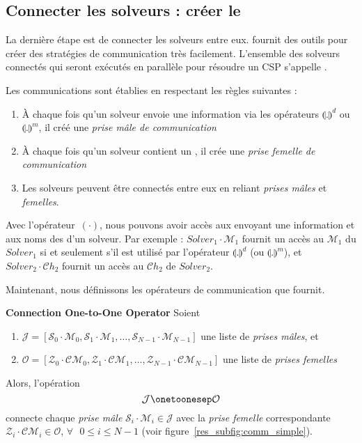 \subsection{Connecter les solveurs : créer le \soset}

La dernière étape est de connecter les solveurs entre eux. \posl{} fournit des outils pour créer des stratégies de communication très facilement. L'ensemble des solveurs connectés qui seront exécutés en parallèle pour résoudre un CSP s'appelle \INTROsoset{}.

Les communications sont établies en respectant les règles suivantes :
\begin{enumerate}
\item  À chaque  fois qu'un  solveur  envoie une information via les opérateurs  $\llparenthesis .\rrparenthesis^{d}$  ou $\llparenthesis   .\rrparenthesis^{m}$, il créé une {\it prise mâle de communication} 
\item À chaque fois qu'un  solveur contient un \opch{}, il  crée une {\it prise femelle de communication} 
\item Les solveurs peuvent être connectés entre eux en reliant {\it prises mâles} et {\it femelles}.
\end{enumerate}

Avec l'opérateur~$(\cdot)$, nous  pouvons avoir accès aux  \oms{} envoyant une information et aux noms des \opchs{} d'un solveur. Par exemple : $Solver_1\cdot\mathcal{M}_1$ fournit un accès au \om{} $\mathcal{M}_1$ du $Solver_1$ si et seulement s'il est utilisé par l'opérateur  $\llparenthesis .\rrparenthesis^{d}$  (ou $\llparenthesis.\rrparenthesis^{m}$), et $Solver_2\cdot\mathcal{C}h_2$ fournit un accès au \opch{} $\mathcal{C}h_2$ de $Solver_2$.

Maintenant, nous définissons les opérateurs de communication que \posl{} fournit.

\begin{lemma}\label{res_op_conn:1to1}
{\bf Connection One-to-One Operator} Soient
\begin{enumerate}
\item $\mathcal{J} = \left[\mathcal{S}_0\cdot \mathcal{M}_0, \mathcal{S}_1\cdot \mathcal{M}_1,\dots, \mathcal{S}_{N-1}\cdot \mathcal{M}_{N-1}\right]$ une liste de  {\it prises mâles}, et
\item $\mathcal{O} = \left[\mathcal{Z}_0\cdot \mathcal{CM}_0, \mathcal{Z}_1\cdot \mathcal{CM}_1,\dots, \mathcal{Z}_{N-1}\cdot \mathcal{CM}_{N-1}\right]$ une liste de {\it prises femelles}
\end{enumerate} Alors, l'opération
\[
\mathcal{J} \onetoonesep \mathcal{O}
\]
connecte chaque {\it prise mâle} $\mathcal{S}_i\cdot \mathcal{M}_i \in \mathcal{J}$ avec la {\it prise femelle} correspondante $\mathcal{Z}_i\cdot \mathcal{CM}_i \in \mathcal{O}$, $\forall\textbf{ }0 \leq i \leq N-1$ (voir figure~\ref{res_subfig:comm_simple}).
\end{lemma}


